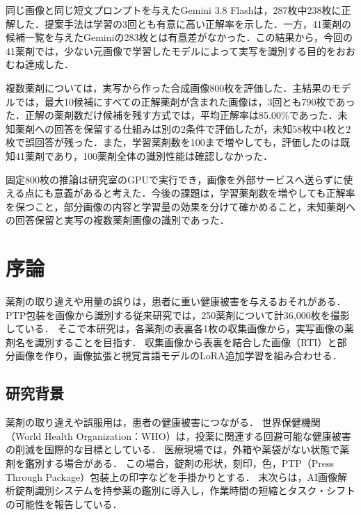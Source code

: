 \documentclass[uplatex,dvipdfmx]{jsarticle}
\begin{document}
同じ画像と同じ短文プロンプトを与えたGemini 3.8 Flashは，287枚中238枚に正解した．提案手法は学習の3回とも有意に高い正解率を示した．一方，41薬剤の候補一覧を与えたGeminiの283枚とは有意差がなかった．この結果から，今回の41薬剤では，少ない元画像で学習したモデルによって実写を識別する目的をおおむね達成した．

複数薬剤については，実写から作った合成画像800枚を評価した．主結果のモデルでは，最大10候補にすべての正解薬剤が含まれた画像は，3回とも790枚であった．正解の薬剤数だけ候補を残す方式では，平均正解率は85.00\%であった．未知薬剤への回答を保留する仕組みは別の2条件で評価したが，未知58枚中4枚と2枚で誤回答が残った．また，学習薬剤数を100まで増やしても，評価したのは既知41薬剤であり，100薬剤全体の識別性能は確認しなかった．

固定800枚の推論は研究室のGPUで実行でき，画像を外部サービスへ送らずに使える点にも意義があると考えた．今後の課題は，学習薬剤数を増やしても正解率を保つこと，部分画像の内容と学習量の効果を分けて確かめること，未知薬剤への回答保留と実写の複数薬剤画像の識別であった．
\newpage

{\small
\tableofcontents
}
\clearpage
\setcounter{page}{1}
\pagestyle{plain}

\section{序論}

薬剤の取り違えや用量の誤りは，患者に重い健康被害を与えるおそれがある\cite{who_medication}．
PTP包装を画像から識別する従来研究では，250薬剤について計36,000枚を撮影している\cite{han2021blister}．
そこで本研究は，各薬剤の表裏各1枚の収集画像から，実写画像の薬剤名を識別することを目指す．
収集画像から表裏を結合した画像（RTI）と部分画像を作り，画像拡張と視覚言語モデルのLoRA追加学習を組み合わせる．

\subsection{研究背景}

薬剤の取り違えや誤服用は，患者の健康被害につながる．
世界保健機関（World Health Organization：WHO）は，投薬に関連する回避可能な健康被害の削減を国際的な目標としている\cite{who_medication}．
医療現場では，外箱や薬袋がない状態で薬剤を鑑別する場合がある．
この場合，錠剤の形状，刻印，色，PTP（Press Through Package）包装上の印字などを手掛かりとする．
末次らは，AI画像解析錠剤識別システムを持参薬の鑑別に導入し，作業時間の短縮とタスク・シフトの可能性を報告している\cite{suetsugu2026ai}．
\end{document}

